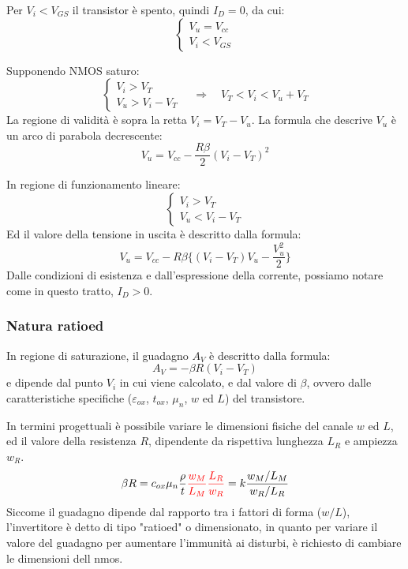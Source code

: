 \documentclass[../template]{subfiles}
\begin{document}
\begin{tcolorbox}
    Per $V_i < V_{GS}$ il transistor è spento, quindi $I_D = 0$, da cui:
    \[
        \begin{cases}
            V_u = V_{cc}
            \\
            V_i < V_{GS}
        \end{cases}
    \]
\end{tcolorbox}
\begin{tcolorbox}
    Supponendo NMOS saturo:
    \[\begin{cases}
        V_i > V_T
        \\
        V_u > V_i - V_T
    \end{cases}
    \quad \Rightarrow \quad
    V_T < V_i < V_u + V_T
\]
    La regione di validità è sopra la retta $V_i = V_T - V_u$.
    La formula che descrive $V_u$ è un arco di parabola decrescente:
    \[
        V_u = V_{cc} - \frac{R\beta}{2} (V_i - V_T)^2
    \]
\end{tcolorbox}
\begin{tcolorbox}
    In regione di funzionamento lineare:
    \[
        \begin{cases}
            V_i > V_T
            \\
            V_u < V_i - V_T
        \end{cases}
    \]
    Ed il valore della tensione in uscita è descritto dalla formula:
    \[
        V_u = V_{cc} - R \beta \big\{ (V_i - V_T) V_u - \frac{V_u^2}{2}\big\}
    \]
    Dalle condizioni di esistenza e dall'espressione della corrente, possiamo notare come in questo tratto, $I_D > 0$.
\end{tcolorbox}

\subsubsection{Natura ratioed}
In regione di saturazione, il guadagno $A_V$ è descritto dalla formula:
\[
    A_V = -\beta R(V_i - V_T)
\]
e dipende dal punto $V_i$ in cui viene calcolato, e dal valore di $\beta$, ovvero dalle caratteristiche specifiche ($\varepsilon_{ox}$, $t_{ox}$, $\mu_n$, $w$ ed $L$) del transistore.

In termini progettuali è possibile variare le dimensioni fisiche del canale $w$ ed $L$, ed il valore della resistenza $R$, dipendente da rispettiva lunghezza $L_R$ e ampiezza $w_R$.
\[
    \beta R = c_{ox} \mu_n \frac{\rho}{t} { \color{red}\frac{w_M}{L_M}\frac{L_R}{w_R}} = k \frac{w_M / L_M}{w_R / L_R}
\]
Siccome il guadagno dipende dal rapporto tra i fattori di forma ($w / L$), l'invertitore è detto di tipo "ratioed" o dimensionato, in quanto per variare il valore del guadagno per aumentare l'immunità ai disturbi, è richiesto di cambiare le dimensioni dell nmos.
\end{document}
